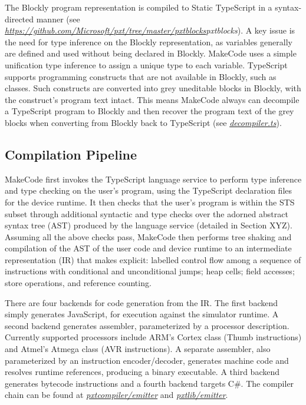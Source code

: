 The Blockly program representation is compiled to Static TypeScript in a syntax-directed manner
(see \emph{\url{https://github.com/Microsoft/pxt/tree/master/pxtblocks}{pxtblocks}}). A key issue is the need for
type inference on the Blockly representation, as variables generally are defined and used without
being declared in Blockly. MakeCode uses a simple unification type inference to assign a
unique type to each variable.  
TypeScript supports programming constructs that are not available in Blockly, such as classes.
Such constructs are converted into grey uneditable blocks in Blockly, with the construct's program
text intact. This means MakeCode always can decompile a TypeScript program to Blockly and then recover
the program text of the grey blocks when converting from Blockly back to TypeScript
 (see \emph{\href{https://github.com/Microsoft/pxt/blob/master/pxtcompiler/emitter/decompiler.ts}{decompiler.ts}}). 

\subsection{Compilation Pipeline}

MakeCode first invokes the TypeScript language service to perform type inference and type checking on the 
user's program, using the TypeScript declaration files for the device runtime.   It then checks that the
user's program is within the STS subset through additional syntactic and type checks over the adorned
abstract syntax tree (AST) produced by the language service (detailed in Section XYZ).  Assuming all the
above checks pass, MakeCode then performs tree shaking and compilation of the AST of the user code and
device runtime to an intermediate representation (IR) that makes explicit: labelled control flow among a
sequence of instructions with conditional and unconditional jumps; heap cells; field accesses; store operations,
and reference counting.

There are four backends for code generation from the IR. The first backend simply generates JavaScript,
for execution against the simulator runtime.  A second backend generates assembler, parameterized by a
processor description.  Currently supported processors include ARM's Cortex class (Thumb instructions)
and Atmel's Atmega class (AVR instructions). A separate assembler, also parameterized by an instruction
encoder/decoder, generates machine code and resolves runtime references, producing a binary executable.
A third backend generates bytecode instructions and a fourth backend targets C\#. 
The compiler chain
can be found at \emph{\href{https://github.com/Microsoft/pxt/tree/master/pxtcompiler/emitter}{pxtcompiler/emitter}} and 
\emph{\href{https://github.com/Microsoft/pxt/tree/master/pxtlib/emitter}{pxtlib/emitter}}.


